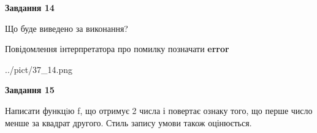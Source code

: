 \documentclass[11pt, ukrainian]{article}
\begin{document}
{\begin {large}
{\begin {center}\textbf{Завдання 14}\end {center}}\par
Що буде виведено за виконання? \par
Повідомлення інтерпретатора про помилку позначати \textbf{error}

\begin{center}
	{../pict/37_14.png}
\end{center}
\newpage

{\begin {center}\textbf{Завдання 15}\end {center}}\par

Написати функцiю f, що отримує 2 числа і повертає ознаку того, що перше число менше за квадрат другого. Стиль запису умови також оцінюється.\par
\newpage

\end {large}}
\end{document}
